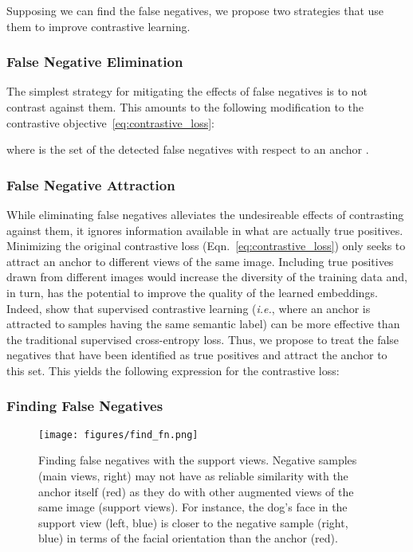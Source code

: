 \documentclass[10pt,twocolumn,letterpaper]{article}
\begin{document}
Supposing we can find the false negatives, we propose two strategies that use them to improve contrastive learning.

\subsubsection{False Negative Elimination}
The simplest strategy for mitigating the effects of false negatives is to not contrast against them. This amounts to the following modification to the contrastive objective~\eqref{eq:contrastive_loss}:

where  is the set of the detected false negatives with respect to an anchor .

\subsubsection{False Negative Attraction}
While eliminating false negatives alleviates the undesireable effects of contrasting against them, it ignores information available in what are actually true positives. Minimizing the original contrastive loss (Eqn.~\ref{eq:contrastive_loss}) only seeks to attract an anchor to different views of the same image. Including true positives drawn from different images would increase the diversity of the training data and, in turn, has the potential to improve the quality of the learned embeddings. Indeed, \citet{khosla2020supervised} show that supervised contrastive learning (\emph{i.e.}, where an anchor is attracted to samples having the same semantic label) can be more effective than the traditional supervised cross-entropy loss. Thus, we propose to treat the false negatives that have been identified as true positives and attract the anchor to this set. This yields the following expression for the contrastive loss:





\subsubsection{Finding False Negatives} \label{sec:find_fn}

\begin{figure}[t]
\begin{center}
    \texttt{[image: figures/find\_fn.png]}
    \caption{Finding false negatives with the support views. Negative samples (main views, right) may not have as reliable similarity with the anchor itself (red) as they do with other augmented views of the same image (support views). For instance, the dog's face in the support view (left, blue) is closer to the negative sample (right, blue) in terms of the facial orientation than the anchor (red).}\label{fig:find_fn}
\end{center}
\vspace{-10pt}
\end{figure}
\end{document}
